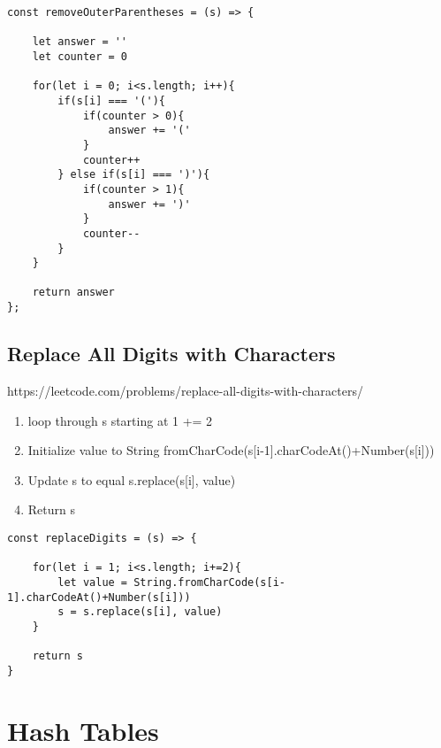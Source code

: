 \documentclass[10pt]{article}
\begin{document}
\begin{lstlisting}[title=Solution removeOuterParentheses, captionpos=t]
const removeOuterParentheses = (s) => {
    
    let answer = ''
    let counter = 0
    
    for(let i = 0; i<s.length; i++){
        if(s[i] === '('){
            if(counter > 0){
                answer += '('
            }
            counter++
        } else if(s[i] === ')'){
            if(counter > 1){
                answer += ')'
            }
            counter--
        }
    }
    
    return answer
};
\end{lstlisting}
\medskip %





\pagebreak %
\medskip 
\subsection{Replace All Digits with Characters}
https://leetcode.com/problems/replace-all-digits-with-characters/

\begin{enumerate}
	\item loop through s starting at 1 += 2
	\item Initialize value to String fromCharCode(s[i-1].charCodeAt()+Number(s[i]))
	\item Update s to equal s.replace(s[i], value)
	\item Return s
\end{enumerate}



\begin{lstlisting}[title=Solution replaceDigits, captionpos=t]
const replaceDigits = (s) => {
    
    for(let i = 1; i<s.length; i+=2){
        let value = String.fromCharCode(s[i-1].charCodeAt()+Number(s[i]))
        s = s.replace(s[i], value)
    }
    
    return s
}
\end{lstlisting}
\medskip %











\pagebreak
\section{Hash Tables}
\end{document}
